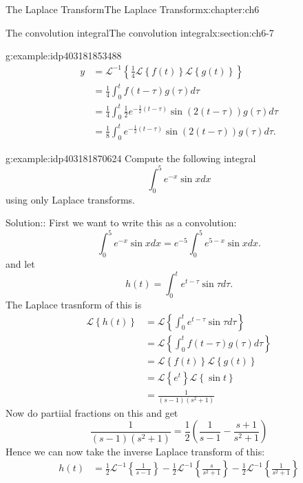 \documentclass[oneside,10pt,]{book}
\numberwithin{equation}{section}
\numberwithin{equation}{section}
\newcommand{\amp}{&}
\begin{document}
\begin{chapterptx}{The Laplace Transform}{}{The Laplace Transform}{}{}{x:chapter:ch6}
\begin{sectionptx}{The convolution integral}{}{The convolution integral}{}{}{x:section:ch6-7}
\begin{example}{}{g:example:idp403181853488}
\begin{align*}
y \amp =\mathcal{L}^{-1}\left\{ \frac{1}{4}\mathcal{L}\left\{ f(t)\right\} \mathcal{L}\left\{ g(t)\right\} \right\} \\
\amp =\frac{1}{4}\int_{0}^{t}f\left(t-\tau\right)g\left(\tau\right)d\tau\\
\amp =\frac{1}{4}\int_{0}^{t}\frac{1}{2}e^{-\frac{1}{2}\left(t-\tau\right)}\sin\left(2\left(t-\tau\right)\right)g\left(\tau\right)d\tau\\
\amp =\frac{1}{8}\int_{0}^{t}e^{-\frac{1}{2}\left(t-\tau\right)}\sin\left(2\left(t-\tau\right)\right)g\left(\tau\right)d\tau.
\end{align*}
%
\end{example}
\begin{example}{}{g:example:idp403181870624}%
Compute the following integral%
\begin{equation*}
\int_{0}^{5}e^{-x}\sin xdx
\end{equation*}
using only Laplace transforms.%
\par
Solution:: First we want to write this as a convolution:%
\begin{equation*}
\int_{0}^{5}e^{-x}\sin xdx=e^{-5}\int_{0}^{5}e^{5-x}\sin xdx.
\end{equation*}
and let%
\begin{equation*}
h(t)=\int_{0}^{t}e^{t-\tau}\sin\tau d\tau.
\end{equation*}
The Laplace trasnform of this is%
\begin{align*}
\mathcal{L}\left\{ h(t)\right\}  \amp =\mathcal{L}\left\{ \int_{0}^{t}e^{t-\tau}\sin\tau d\tau\right\} \\
\amp =\mathcal{L}\left\{ \int_{0}^{t}f(t-\tau)g(\tau)d\tau\right\} \\
\amp =\mathcal{L}\left\{ f(t)\right\} \mathcal{L}\left\{ g(t)\right\} \\
\amp =\mathcal{L}\left\{ e^{t}\right\} \mathcal{L}\left\{ \sin t\right\} \\
\amp =\frac{1}{\left(s-1\right)\left(s^{2}+1\right)}
\end{align*}
Now do partiial fractions on this and get%
\begin{equation*}
\frac{1}{\left(s-1\right)\left(s^{2}+1\right)}=\frac{1}{2}\left(\frac{1}{s-1}-\frac{s+1}{s^{2}+1}\right)
\end{equation*}
Hence we can now take the inverse Laplace transform of this:%
\begin{align*}
h(t) \amp =\frac{1}{2}\mathcal{L}^{-1}\left\{ \frac{1}{s-1}\right\} -\frac{1}{2}\mathcal{L}^{-1}\left\{ \frac{s}{s^{2}+1}\right\} -\frac{1}{2}\mathcal{L}^{-1}\left\{ \frac{1}{s^{2}+1}\right\} \\

\end{align*}
\end{example}
\end{sectionptx}
\end{chapterptx}
\end{document}
